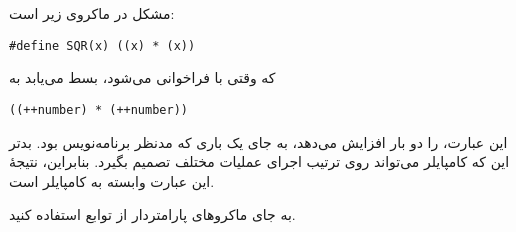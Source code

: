 \section{}
\paragraph{}\label{answer:88}
مشکل در ماکروی زیر است:
\begin{LTR}
        \begin{lstlisting}[style=C++Style]
            #define SQR(x) ((x) * (x))
        \end{lstlisting}
\end{LTR}

که وقتی با  فراخوانی می‌شود، بسط می‌یابد به
\begin{LTR}
        \begin{lstlisting}[style=C++Style]
            ((++number) * (++number))
        \end{lstlisting}
\end{LTR}

این عبارت،  را دو بار افزایش می‌دهد، به جای یک باری که مدنظر برنامه‌نویس بود. بدتر این که کامپایلر می‌تواند روی ترتیب اجرای عملیات مختلف تصمیم بگیرد. بنابراین، نتیجهٔ این عبارت وابسته به کامپایلر است.

به جای ماکروهای پارامتردار از توابع  استفاده کنید.